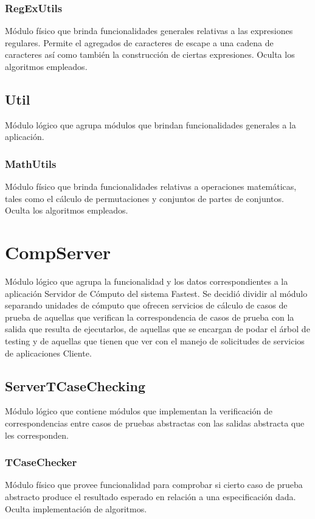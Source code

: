 \documentclass[a4paper,10pt]{report}
\begin{document}
		\subsection{RegExUtils}
		Módulo físico que brinda funcionalidades generales relativas a las expresiones regulares. Permite el agregados de caracteres de escape a una cadena de caracteres así como también la construcción de ciertas expresiones.
		Oculta los algoritmos empleados.
	\section{Util}
	Módulo lógico que agrupa módulos que brindan funcionalidades generales a la aplicación.
		\subsection{MathUtils}
		Módulo físico que brinda funcionalidades relativas a operaciones matemáticas, tales como el cálculo de permutaciones y conjuntos de partes de conjuntos.
		Oculta los algoritmos empleados.









\chapter{CompServer}
Módulo lógico que agrupa la funcionalidad y los datos correspondientes a la aplicación Servidor de Cómputo del sistema Fastest. Se decidió dividir al módulo separando unidades de cómputo que ofrecen servicios de cálculo de casos de prueba de aquellas que verifican la correspondencia de casos de prueba con la salida que resulta de ejecutarlos, de aquellas que se encargan de podar el árbol de testing y de aquellas que tienen que ver con el manejo de solicitudes de servicios de aplicaciones Cliente.
	\section{ServerTCaseChecking}
	Módulo lógico que contiene módulos que implementan la verificación de correspondencias entre casos de pruebas abstractas con las salidas abstracta que les corresponden. 
		\subsection{TCaseChecker}
		Módulo físico que provee funcionalidad para comprobar si cierto caso de prueba abstracto produce el resultado esperado en relación a una especificación dada. Oculta implementación de algoritmos.
\end{document}

